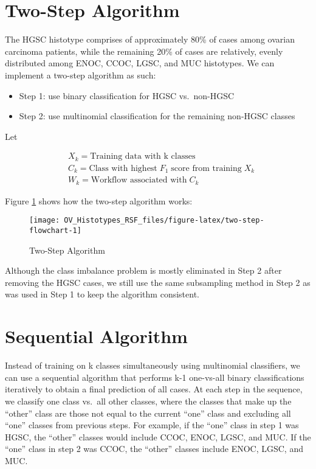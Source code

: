 \documentclass[
]{report}
\providecommand{\tightlist}{%
  \setlength{\itemsep}{0pt}\setlength{\parskip}{0pt}}
\begin{document}
\hypertarget{two-step-algorithm}{%
\section{Two-Step Algorithm}\label{two-step-algorithm}}

The HGSC histotype comprises of approximately 80\% of cases among ovarian carcinoma patients, while the remaining 20\% of cases are relatively, evenly distributed among ENOC, CCOC, LGSC, and MUC histotypes. We can implement a two-step algorithm as such:

\begin{itemize}
\tightlist
\item
  Step 1: use binary classification for HGSC vs.~non-HGSC
\item
  Step 2: use multinomial classification for the remaining non-HGSC classes
\end{itemize}

Let

\[
\begin{aligned}
& X_k = \text{Training data with k classes}  \\
& C_k = \text{Class with highest}\;F_1\;\text{score from training}\;X_k \\
& W_k = \text{Workflow associated with}\;C_k
\end{aligned}
\label{eq:sequential}
\]

Figure \ref{fig:two-step-flowchart} shows how the two-step algorithm works:

\begin{figure}[H]

{\centering \texttt{[image: OV\_Histotypes\_RSF\_files/figure-latex/two-step-flowchart-1]} 

}

\caption{Two-Step Algorithm}\label{fig:two-step-flowchart}
\end{figure}

Although the class imbalance problem is mostly eliminated in Step 2 after removing the HGSC cases, we still use the same subsampling method in Step 2 as was used in Step 1 to keep the algorithm consistent.

\hypertarget{sequential-algorithm}{%
\section{Sequential Algorithm}\label{sequential-algorithm}}

Instead of training on k classes simultaneously using multinomial classifiers, we can use a sequential algorithm that performs k-1 one-vs-all binary classifications iteratively to obtain a final prediction of all cases. At each step in the sequence, we classify one class vs.~all other classes, where the classes that make up the ``other'' class are those not equal to the current ``one'' class and excluding all ``one'' classes from previous steps. For example, if the ``one'' class in step 1 was HGSC, the ``other'' classes would include CCOC, ENOC, LGSC, and MUC. If the ``one'' class in step 2 was CCOC, the ``other'' classes include ENOC, LGSC, and MUC.
\end{document}
